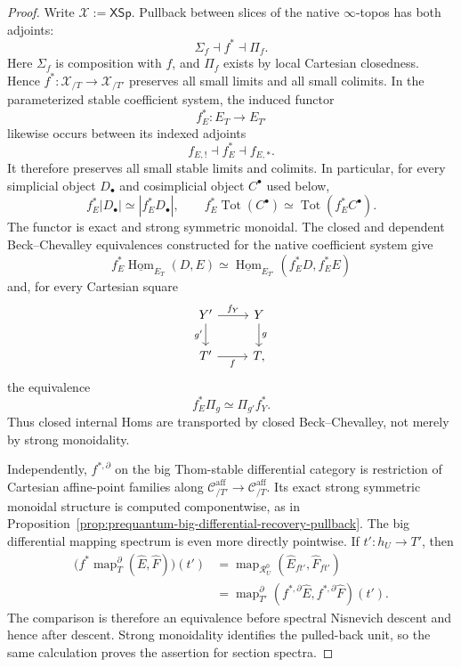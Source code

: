 \begin{proof}
Write $\mathscr X:=\mathsf{XSp}$.  Pullback between slices of the native
$\infty$-topos has both adjoints:
\[
\Sigma_f\dashv f^*\dashv\Pi_f.
\]
Here $\Sigma_f$ is composition with $f$, and $\Pi_f$ exists by local Cartesian
closedness.  Hence $f^*:\mathscr X_{/T}\to\mathscr X_{/T'}$ preserves all small
limits and all small colimits.  In the parameterized stable coefficient system,
the induced functor
\[
f_E^*:E_T\longrightarrow E_{T'}
\]
likewise occurs between its indexed adjoints
\[
f_{E,!}\dashv f_E^*\dashv f_{E,*}.
\]
It therefore preserves all small stable limits and colimits.  In particular,
for every simplicial object $D_\bullet$ and cosimplicial object $C^\bullet$ used
below,
\[
f_E^*|D_\bullet|
\simeq|f_E^*D_\bullet|,
\qquad
f_E^*\operatorname{Tot}(C^\bullet)
\simeq\operatorname{Tot}(f_E^*C^\bullet).
\]
The functor is exact and strong symmetric monoidal.  The closed and dependent
Beck--Chevalley equivalences constructed for the native coefficient system give
\[
f_E^*
\underline{\operatorname{Hom}}_{E_T}(D,E)
\simeq
\underline{\operatorname{Hom}}_{E_{T'}}
(f_E^*D,f_E^*E)
\]
and, for every Cartesian square
\[
\begin{tikzcd}
Y' \ar[r,"f_Y"] \ar[d,"g'"'] & Y \ar[d,"g"]\\
T' \ar[r,"f"'] & T,
\end{tikzcd}
\]
the equivalence
\[
f_E^*\Pi_g
\simeq
\Pi_{g'}f_Y^*.
\]
Thus closed internal Homs are transported by closed Beck--Chevalley, not merely
by strong monoidality.

Independently, $f^{*,\partial}$ on the big Thom-stable differential category is
restriction of Cartesian affine-point families along
$\mathcal C^{\mathrm{aff}}_{/T'}\to\mathcal C^{\mathrm{aff}}_{/T}$.  Its exact
strong symmetric monoidal structure is computed componentwise, as in
Proposition~\ref{prop:prequantum-big-differential-recovery-pullback}.
The big differential mapping spectrum is even more directly pointwise.  If
$t':h_U\to T'$, then
\[
\begin{aligned}
\bigl(f^*\operatorname{map}^{\partial}_T(\widehat E,\widehat F)\bigr)(t')
&=
\operatorname{map}_{\mathcal R_U^0}
(\widehat E_{ft'},\widehat F_{ft'})\\
&=
\operatorname{map}^{\partial}_{T'}
(f^{*,\partial}\widehat E,f^{*,\partial}\widehat F)(t').
\end{aligned}
\]
The comparison is therefore an equivalence before spectral Nisnevich descent
and hence after descent.  Strong monoidality identifies the pulled-back unit, so
the same calculation proves the assertion for section spectra.


\end{proof}
